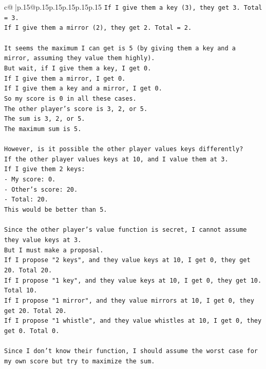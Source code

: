 \documentclass{article}
\begin{document}
{\begin{supertabular}{c@{$\;$}|p{.15\linewidth}@{}p{.15\linewidth}p{.15\linewidth}p{.15\linewidth}p{.15\linewidth}p{.15\linewidth}}
{{{\texttt{If I give them a key (3), they get 3. Total = 3.} \\
\texttt{If I give them a mirror (2), they get 2. Total = 2.} \\
\\ 
\texttt{It seems the maximum I can get is 5 (by giving them a key and a mirror, assuming they value them highly).} \\
\texttt{But wait, if I give them a key, I get 0.} \\
\texttt{If I give them a mirror, I get 0.} \\
\texttt{If I give them a key and a mirror, I get 0.} \\
\texttt{So my score is 0 in all these cases.} \\
\texttt{The other player's score is 3, 2, or 5.} \\
\texttt{The sum is 3, 2, or 5.} \\
\texttt{The maximum sum is 5.} \\
\\ 
\texttt{However, is it possible the other player values keys differently?} \\
\texttt{If the other player values keys at 10, and I value them at 3.} \\
\texttt{If I give them 2 keys:} \\
\texttt{{-} My score: 0.} \\
\texttt{{-} Other's score: 20.} \\
\texttt{{-} Total: 20.} \\
\texttt{This would be better than 5.} \\
\\ 
\texttt{Since the other player's value function is secret, I cannot assume they value keys at 3.} \\
\texttt{But I must make a proposal.} \\
\texttt{If I propose "2 keys", and they value keys at 10, I get 0, they get 20. Total 20.} \\
\texttt{If I propose "1 key", and they value keys at 10, I get 0, they get 10. Total 10.} \\
\texttt{If I propose "1 mirror", and they value mirrors at 10, I get 0, they get 20. Total 20.} \\
\texttt{If I propose "1 whistle", and they value whistles at 10, I get 0, they get 0. Total 0.} \\
\\ 
\texttt{Since I don't know their function, I should assume the worst case for my own score but try to maximize the sum.} \\
}}}
\end{supertabular}}
\end{document}
